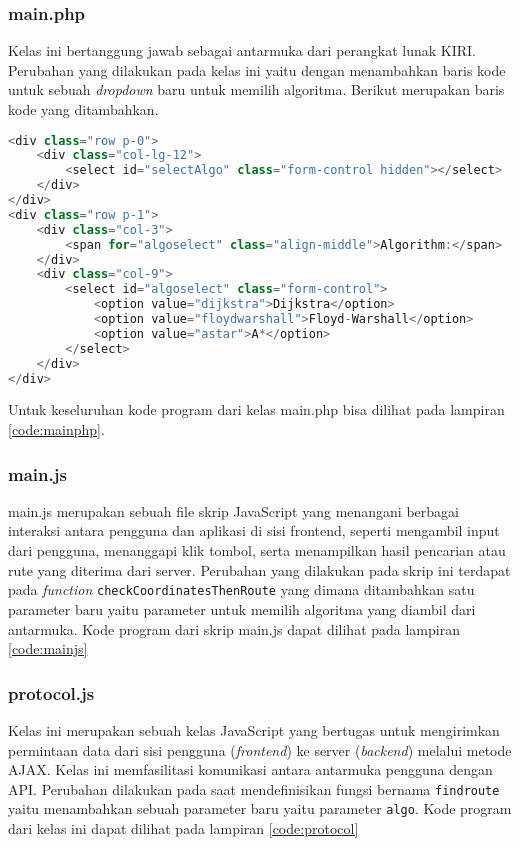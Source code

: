 \subsubsection{main.php}
Kelas ini bertanggung jawab sebagai antarmuka dari perangkat lunak KIRI. Perubahan yang dilakukan pada kelas ini yaitu dengan menambahkan baris kode untuk sebuah \textit{dropdown} baru untuk memilih algoritma. Berikut merupakan baris kode yang ditambahkan.

\begin{lstlisting}[language=Java, caption=main.php, basicstyle=\small\ttfamily]
<div class="row p-0">
	<div class="col-lg-12">
		<select id="selectAlgo" class="form-control hidden"></select>
	</div>
</div>
<div class="row p-1">
	<div class="col-3">
		<span for="algoselect" class="align-middle">Algorithm:</span>
	</div>
	<div class="col-9">
		<select id="algoselect" class="form-control">
			<option value="dijkstra">Dijkstra</option>
			<option value="floydwarshall">Floyd-Warshall</option>
			<option value="astar">A*</option>
		</select>
	</div>
</div>
\end{lstlisting}
\noindent
Untuk keseluruhan kode program dari kelas main.php bisa dilihat pada lampiran \ref{code:mainphp}.
\subsubsection{main.js}
main.js merupakan sebuah file skrip JavaScript yang menangani berbagai interaksi antara pengguna dan aplikasi di sisi frontend, seperti mengambil input dari pengguna, menanggapi klik tombol, serta menampilkan hasil pencarian atau rute yang diterima dari server. Perubahan yang dilakukan pada skrip ini terdapat pada \textit{function} \texttt{checkCoordinatesThenRoute} yang dimana ditambahkan satu parameter baru yaitu parameter untuk memilih algoritma yang diambil dari antarmuka. Kode program dari skrip main.js dapat dilihat pada lampiran \ref{code:mainjs}

\subsubsection{protocol.js}
Kelas ini merupakan sebuah kelas JavaScript yang bertugas untuk mengirimkan permintaan data dari sisi pengguna (\textit{frontend}) ke server (\textit{backend}) melalui metode AJAX. Kelas ini memfasilitasi komunikasi antara antarmuka pengguna dengan API. Perubahan dilakukan pada saat mendefinisikan fungsi bernama \texttt{findroute} yaitu menambahkan sebuah parameter baru yaitu parameter \texttt{algo}. Kode program dari kelas ini dapat dilihat pada lampiran \ref{code:protocol}

